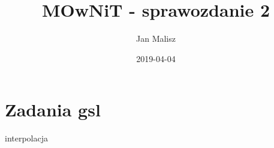 \documentclass[10pt,a4paper]{article}
\title{MOwNiT - sprawozdanie 2}
\author{Jan Malisz}
\date{2019-04-04}
\begin{document}
  \maketitle
  \thispagestyle{empty}

  \newpage
  \section*{Zadania gsl} \label{sec:ZadaniaGsl}
  {interpolacja}
\end{document}
